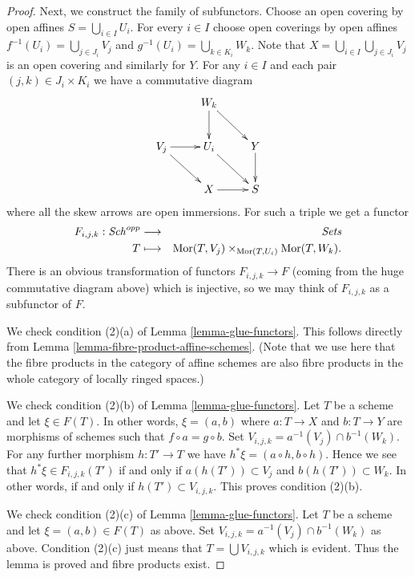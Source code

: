 \begin{proof}
\medskip\noindent
Next, we construct the family of subfunctors.
Choose an open covering by open affines
$S = \bigcup\nolimits_{i \in I} U_i$.
For every $i \in I$ choose open coverings by open affines
$f^{-1}(U_i) = \bigcup\nolimits_{j \in J_i} V_j$ and
$g^{-1}(U_i) = \bigcup\nolimits_{k \in K_i} W_k$.
Note that $X = \bigcup_{i \in I} \bigcup_{j \in J_i} V_j$
is an open covering and similarly for $Y$.
For any $i \in I$ and each pair $(j, k) \in J_i \times K_i$
we have a commutative diagram
$$
\xymatrix{
    & W_k \ar[d] \ar[rd] &   \\
V_j \ar[rd] \ar[r] & U_i \ar[rd] & Y \ar[d] \\
    & X \ar[r]  & S
}
$$
where all the skew arrows are open immersions. For such a
triple we get a functor
\begin{eqnarray*}
F_{i, j, k} : \mathit{Sch}^{opp} & \longrightarrow & \textit{Sets} \\
T & \longmapsto &
\mathop{\mathrm{Mor}}\nolimits(T, V_j) \times_{\mathop{\mathrm{Mor}}\nolimits(T, U_i)} \mathop{\mathrm{Mor}}\nolimits(T, W_k).
\end{eqnarray*}
There is an obvious transformation of functors $F_{i, j, k} \to F$
(coming from the huge commutative diagram above)
which is injective, so we may think of $F_{i, j, k}$ as a subfunctor
of $F$.

\medskip\noindent
We check condition (2)(a) of Lemma \ref{lemma-glue-functors}.
This follows directly from Lemma \ref{lemma-fibre-product-affine-schemes}.
(Note that we use here that the fibre products in the category of
affine schemes are also fibre products in the whole category of locally
ringed spaces.)

\medskip\noindent
We check condition (2)(b) of Lemma \ref{lemma-glue-functors}.
Let $T$ be a scheme and let $\xi \in F(T)$. In other words,
$\xi = (a, b)$ where $a : T \to X$ and $b : T \to Y$ are
morphisms of schemes such that $f \circ a = g \circ b$.
Set $V_{i, j, k} = a^{-1}(V_j) \cap b^{-1}(W_k)$. For any
further morphism $h : T' \to T$ we have
$h^*\xi = (a \circ h, b \circ h)$. Hence we see that
$h^*\xi \in F_{i, j, k}(T')$ if and only if
$a(h(T')) \subset V_j$ and $b(h(T')) \subset W_k$.
In other words, if and only if $h(T') \subset V_{i, j, k}$.
This proves condition (2)(b).

\medskip\noindent
We check condition (2)(c) of Lemma \ref{lemma-glue-functors}.
Let $T$ be a scheme and let $\xi = (a, b) \in F(T)$ as above.
Set $V_{i, j, k} = a^{-1}(V_j) \cap b^{-1}(W_k)$ as above.
Condition (2)(c) just means that $T = \bigcup V_{i, j, k}$
which is evident. Thus the lemma is proved and fibre products
exist.
\end{proof}

